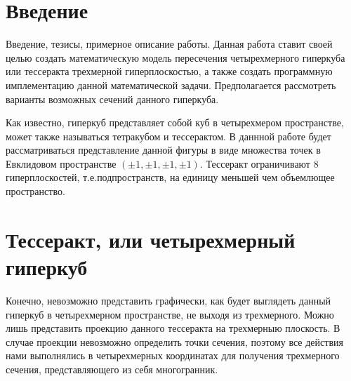 \documentclass[12pt, a4paper, twoside]{report}
\begin{document}

\tableofcontents

\newpage
\section{Введение}
Введение, тезисы, примерное описание работы.
Данная работа ставит своей целью создать математическую модель пересечения четырехмерного гиперкуба или тессеракта трехмерной гиперплоскостью, а также создать программную имплементацию данной математической задачи. Предполагается рассмотреть варианты возможных сечений данного гиперкуба.

Как известно, гиперкуб представляет собой куб в четырехмером пространстве, может также называться тетракубом и тессерактом. В даннной работе будет рассматриваться представление данной фигуры в виде множества точек в Евклидовом пространстве $(\pm 1,\pm 1,\pm 1, \pm 1)$. Тессеракт ограничивают 8 гиперплоскостей, т.е.подпространств, на единицу меньшей чем объемлющее пространство.

\begin{figure}[h!]
	\center
	\clearpage
\end{figure}
\section{Тессеракт, или четырехмерный гиперкуб}
Конечно, невозможно представить графически, как будет выглядеть данный гиперкуб в четырехмерном пространстве, не выходя из трехмерного. Можно лишь представить проекцию данного тессеракта на трехмерныю плоскость. В случае проекции невозможно определить точки сечения, поэтому все действия нами выполнялись в четырехмерных координатах для получения трехмерного сечения, представляющего из себя многогранник.
\end{document}

